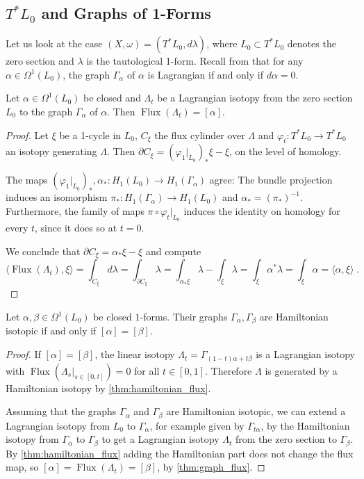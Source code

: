 \documentclass[12pt,a4paper,abstract=true,final]{scrartcl}
\DeclareMathOperator{\Flux}{Flux}
\begin{document}
\subsection{\texorpdfstring{$T^* L_0$}{T*L} and Graphs of 1-Forms} 
\label{sec:vdcotangent}

Let us look at the case $(X,ω)=(T^* L_0,d λ)$, where $L_0 ⊂ T^* L_0$ denotes the zero section and $λ$ is the tautological 1-form.
Recall from \cite{McDuffSalamonSympTop} that for any $α ∈ Ω^1(L_0)$, the graph $Γ_α$ of $α$ is Lagrangian if and only if $d α=0$.

\begin{lemma}
  \label{thm:graph_flux}
  Let $α ∈ Ω^1(L_0)$ be closed and $Λ_t$ be a Lagrangian isotopy from the zero section $L_0$ to the graph $Γ_α$ of $α$.
Then $\Flux(Λ_t) = [α]$.
\end{lemma}
\begin{proof}
  Let $ξ$ be a 1-cycle in $L_0$, $C_ξ$ the flux cylinder over $Λ$ and $\varphi_t \colon T^*L_0 \rightarrow T^*L_0$ an isotopy generating $\Lambda$.
Then $∂C_ξ = (\varphi_1\vert_{L_0})_* ξ - ξ$, on the level of homology.

The maps $(\varphi_1\vert_{L_0})_*, \alpha_* \colon H_1(L_0) \rightarrow H_1(\Gamma_{\alpha})$ agree:
The bundle projection induces an isomorphism $\pi_* \colon H_1(Γ_α) \rightarrow H_1(L_0)$ and $\alpha_* = (\pi_*)^{-1}$. Furthermore, the family of maps $\pi \circ \varphi_t\vert_{L_0}$ induces the identity on homology for every $t$, since it does so at $t=0$.

We conclude that $∂C_ξ = α_* ξ - ξ$ and compute
  \[⟨\Flux(Λ_t),ξ ⟩ = ∫_{C_ξ} dλ = ∫_{∂C_ξ} λ = ∫_{α_* ξ}λ - ∫_{ξ} λ = ∫_{ξ} α^* λ = ∫_{ξ} α = ⟨α,ξ⟩ \;.\]
\end{proof}

\begin{lemma}
  \label{thm:graph_hamiltonian_isotopic}
  Let $\alpha,\beta \in  \Omega^1(L_0)$ be closed $1$-forms.
Their graphs $\Gamma_{\alpha}, \Gamma_{\beta}$ are Hamiltonian isotopic if and only if $[\alpha] = [\beta]$.
\end{lemma}
\begin{proof}
If $[\alpha] = [\beta]$, the linear isotopy $\Lambda_t = Γ_{(1-t)α + t β}$ is a Lagrangian isotopy with $\Flux(Λ_s|_{s ∈ [0,t]}) = 0$ for all $t \in [0,1]$.
Therefore $\Lambda$ is generated by a Hamiltonian isotopy by \cref{thm:hamiltonian_flux}.

  Assuming that the graphs $Γ_α$ and $Γ_β$ are Hamiltonian isotopic, we can extend a Lagrangian isotopy from $L_0$ to $Γ_α$, for example given by $Γ_{tα}$, by the Hamiltonian isotopy from $Γ_α$ to $Γ_β$ to get a Lagrangian isotopy $Λ_t$ from the zero section to $Γ_β$.
By \cref{thm:hamiltonian_flux} adding the Hamiltonian part does not change the flux map, so $[α] = \Flux(Λ_t) = [β]$, by \cref{thm:graph_flux}.
\end{proof}
\end{document}
